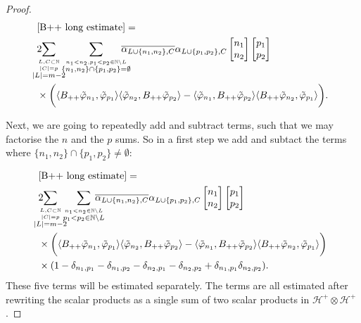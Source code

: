 \documentclass[b5paper,draft,openbib,12pt]{memoir}
\begin{document}
\begin{proof}
\begin{align}
  &\eqref{B++ long estimate} =\notag\\
  &2\hspace{-0.4cm}\sum_{\overset{L,C\subset \mathbb{N}}{\overset{|C|=p}{|L|=m-2}}}\hspace{-0.2cm}\sum_{\overset{n_1<n_2,p_1<p_2\in\mathbb{N}\backslash L }{\{n_1,n_2\}\cap \{p_1,p_2\}= \emptyset}}
  \hspace{-0.4cm}\overline{\alpha_{L\cup\{n_1,n_2\},C}}\alpha_{L\cup\{p_1,p_2\},C}
\left[\begin{matrix}n_1\\n_2\end{matrix}\right]\left[\begin{matrix}p_1\\p_2\end{matrix}\right]\\
    &\times \bigg(
    \langle B_{++}\tilde{\varphi}_{n_1},\tilde{\varphi}_{p_1} \rangle \langle  \tilde{\varphi}_{n_2}, B_{++}\tilde{\varphi}_{p_2}\rangle
    -\langle \tilde{\varphi}_{n_1},B_{++}\tilde{\varphi}_{p_2} \rangle \langle B_{++} \tilde{\varphi}_{n_2}, \tilde{\varphi}_{p_1}\rangle\bigg).
\end{align}

Next, we are going to repeatedly add and subtract terms, such that we may
factorise the \(n\) and the \(p\) sums. So in a first step we add and subtact the 
terms where \(\{n_1,n_2\}\cap \{p_1,p_2\}\neq \emptyset\):

\begin{align}
  &\eqref{B++ long estimate} =\notag\\
  &2\hspace{-0.4cm}\sum_{\overset{L,C\subset \mathbb{N}}{\overset{|C|=p}{|L|=m-2}}}\hspace{-0.2cm}\sum_{\overset{n_1<n_2\in\mathbb{N}\backslash L }{p_1<p_2\in\mathbb{N}\backslash L }}
  \hspace{-0.4cm}\overline{\alpha_{L\cup\{n_1,n_2\},C}}\alpha_{L\cup\{p_1,p_2\},C}
\left[\begin{matrix}n_1\\n_2\end{matrix}\right]\left[\begin{matrix}p_1\\p_2\end{matrix}\right]\\
    &\times \bigg(
    \langle B_{++}\tilde{\varphi}_{n_1},\tilde{\varphi}_{p_1} \rangle \langle  \tilde{\varphi}_{n_2}, B_{++}\tilde{\varphi}_{p_2}\rangle
    -\langle \tilde{\varphi}_{n_1},B_{++}\tilde{\varphi}_{p_2} \rangle \langle B_{++} \tilde{\varphi}_{n_2}, \tilde{\varphi}_{p_1}\rangle\bigg)\\
    &\times (1- \delta_{n_1,p_1}-\delta_{n_1,p_2}-\delta_{n_2,p_1}-\delta_{n_2,p_2}+\delta_{n_1,p_1}\delta_{n_2,p_2}).
\end{align}
These five terms will be estimated separately. The terms 
are all estimated after rewriting the scalar products as a 
single sum of two scalar products in \(\mathcal{H}^+\otimes \mathcal{H}^+\).


\end{proof}
\end{document}
